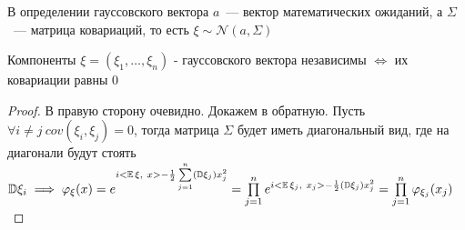 \begin{corollary} В определении гауссовского вектора $a$~--- вектор математических ожиданий, а $\Sigma$~--- матрица ковариаций, то есть $\xi \sim \mathcal{N}(a, \Sigma)$
\end{corollary}

\begin{theorem} Компоненты $\xi = (\xi_1, \ldots, \xi_n)$ - гауссовского вектора независимы $\iff$ их ковариации равны 0
\end{theorem}

\begin{proof} В правую сторону очевидно. Докажем в обратную. Пусть $\forall i \neq j \ cov(\xi_i, \xi_j) = 0$, тогда матрица $\Sigma$ будет иметь диагональный вид, где на диагонали будут стоять $\D\xi_i \implies \varphi_\xi(x) = e^{i<\E\xi, \ x> - \frac{1}{2}\sum\limits_{j=1}^n(\D\xi_j)x_j^2} = \prod\limits_{j=1}^n e^{i<\E\xi_j, \ x_j> - \frac{1}{2}(\D\xi_j)x_j^2} = \prod\limits_{j=1}^n \varphi_{\xi_j}(x_j)$ \end{proof}